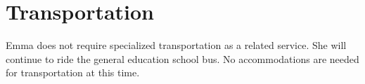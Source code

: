 \section{Transportation}

\begin{iepbox}
Emma does not require specialized transportation as a related service. She will continue to ride the general education school bus. No accommodations are needed for transportation at this time.
\end{iepbox}
